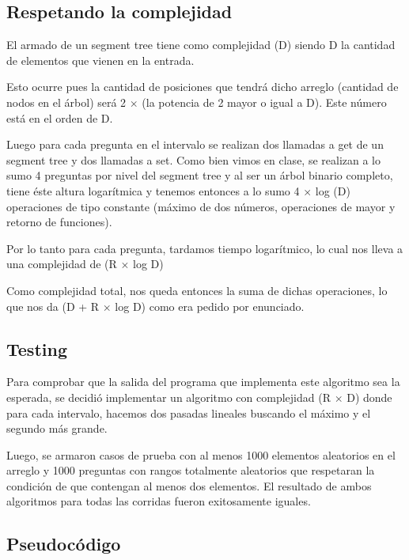 \subsection{Respetando la complejidad}

El armado de un segment tree tiene como complejidad \bigo(D) siendo D la cantidad de elementos que vienen en la entrada.\newline

Esto ocurre pues la cantidad de posiciones que tendrá dicho arreglo (cantidad de nodos en el árbol) será 2 $\times$ (la potencia de 2 mayor o igual a D). Este número está en el orden de D. \newline

Luego para cada pregunta en el intervalo se realizan dos llamadas a get de un segment tree y dos llamadas a set. Como bien vimos en clase, se realizan a lo sumo 4 preguntas por nivel del segment tree y al ser un árbol binario completo, tiene éste altura logarítmica y tenemos entonces a lo sumo 4 $\times$ log (D) operaciones de tipo constante (máximo de dos números, operaciones de mayor y retorno de funciones).\newline

Por lo tanto para cada pregunta, tardamos tiempo logarítmico, lo cual nos lleva a una complejidad de \bigo(R $\times$ log D)  \newline 

Como complejidad total, nos queda entonces la suma de dichas operaciones, lo que nos da \bigo(D + R $\times$ log D) como era pedido por enunciado.

\subsection{Testing}

Para comprobar que la salida del programa que implementa este algoritmo sea la esperada, se decidió implementar un algoritmo con complejidad \bigo(R $\times$ D) donde para cada intervalo, hacemos dos pasadas lineales buscando el máximo y el segundo más grande. \newline

Luego, se armaron casos de prueba con al menos 1000 elementos aleatorios en el arreglo y 1000 preguntas con rangos totalmente aleatorios que respetaran la condición de que contengan al menos dos elementos. El resultado de ambos algoritmos para todas las corridas fueron exitosamente iguales.

\subsection{Pseudocódigo}


